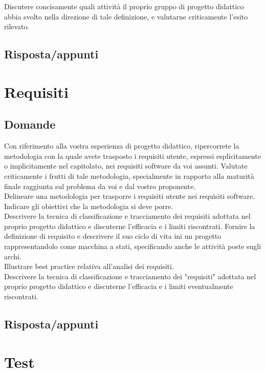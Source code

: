 Discutere concisamente quali attività il proprio gruppo di progetto didattico abbia svolto nella direzione di tale definizione, e valutarne criticamente l'esito rilevato.

\subsection*{Risposta/appunti}


\section{Requisiti}

\subsection*{Domande}
Con riferimento alla vostra esperienza di progetto didattico, ripercorrete la metodologia con la quale avete trasposto i requisiti utente, espressi esplicitamente o implicitamente nel capitolato, nei requisiti software da voi assunti.
Valutate criticamente i frutti di tale metodologia, specialmente in rapporto alla maturità finale raggiunta sul problema da voi e dal vostro proponente.\\

Delineare una metodologia per trasporre i requisiti utente nei requisiti software. 
Indicare gli obiettivi che la metodologia si deve porre.\\

Descrivere la tecnica di classificazione e tracciamento dei requisiti adottata nel proprio progetto didattico e discuterne l'efficacia e i limiti riscontrati.
Fornire la definizione di requisito e descrivere il suo ciclo di vita ini un progetto rappresentandolo come macchina a stati, specificando anche le attività poste sugli archi.\\

Illustrare best practice relativa all'analisi dei requisiti.\\

Descrivere la tecnica di classificazione e tracciamento dei "requisiti" adottata nel proprio progetto didattico e discuterne l'efficacia e i limiti eventualmente riscontrati.

\subsection*{Risposta/appunti}

\section{Test}

